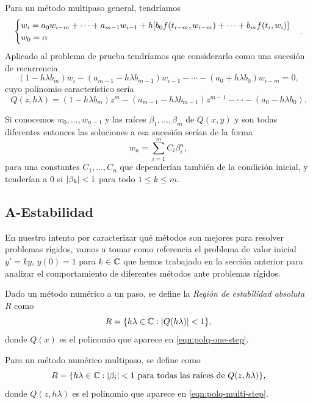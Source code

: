 Para un método multipaso general, tendríamos
\begin{equation*}
    \begin{cases}
        w_i =
        a_0w_{i-m} + \cdots + a_{m-1}w_{i-1} + h\qty[
            b_0f(t_{i-m}, w_{i-m}) + \cdots + b_mf(t_i, w_i)
        ] \\
        w_0 = \alpha
    \end{cases}.
\end{equation*}
Aplicado al problema de prueba tendríamos que considerarlo como
una sucesión de recurrencia
\begin{equation*}
    (1 - h\lambda b_m)w_i
    - (a_{m-1} - h\lambda b_{m-1})w_{i-1}
    - \cdots
    - (a_0 + h\lambda b_0)w_{i-m} = 0,
\end{equation*}
cuyo polinomio característico sería
\begin{equation}\label{eqn:polq-multi-step}
    Q(z, h\lambda) =
    (1 - h\lambda b_m)z^m
    - (a_{m-1} - h\lambda b_{m-1})z^{m-1}
    - \cdots
    - (a_0 - h\lambda b_0).
\end{equation}

Si conocemos $w_0,\ldots,w_{n-1}$
y las raíces $\beta_1,\ldots,\beta_m$ de $Q(x, y)$
y son todas diferentes %
entonces las soluciones a esa sucesión serían de la forma
\begin{equation*}
    w_n = \sum_{i=1}^m C_i\beta_i^n,
\end{equation*}
para una constantes $C_1,\ldots,C_n$
que dependerían también de la condición inicial,
y tenderían a $0$ si $\abs{\beta_k} < 1$ para todo $1 \le k \le m$.

\subsection{A-Estabilidad}

En nuestro intento por caracterizar
qué métodos son mejores para resolver problemas rígidos,
vamos a tomar como referencia el problema de valor inicial
$y' = ky$, $y(0) = 1$ para $k \in \mathbb{C}$
que hemos trabajado en la sección anterior
para analizar el comportamiento de diferentes métodos
ante problemas rígidos.

\begin{definition}
    Dado un método numérico a un paso, se define
    la \emph{Región de estabilidad absoluta} $R$
    como
    \begin{equation*}
        R = \qty{h\lambda \in \mathbb{C}: \abs{Q(h\lambda)} < 1},
    \end{equation*}
    donde $Q(x)$ es el polinomio que aparece en \eqref{eqn:polq-one-step}.

    Para un método numérico multipaso, se define como
    \begin{equation*}
        R = \qty{h\lambda \in \mathbb{C}:
        \text{$\abs{\beta_i} < 1$ para todas las raíces de $Q(z, h\lambda)$}},
    \end{equation*}
    donde $Q(z, h\lambda)$ es el polinomio que aparece en
    \eqref{eqn:polq-multi-step}.
\end{definition}

